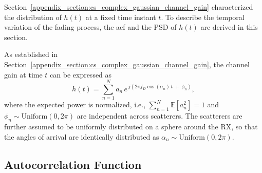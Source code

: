 Section~\ref{appendix_section:cs_complex_gaussian_channel_gain} characterized the distribution of $h(t)$ at a fixed time instant $t$.
To describe the temporal variation of the fading process, the \acf{acf} and the \acf{PSD} of $h(t)$ are derived in this section.

As established in Section~\ref{appendix_section:cs_complex_gaussian_channel_gain}, the channel gain at time $t$ can be expressed as
\begin{equation}
    h(t) = \sum_{n=1}^{N} a_n \, e^{\,j(2\pi f_D \cos(\alpha_n)\, t \;+\; \phi_n)},
\end{equation}
where the expected power is normalized, i.e., $\sum_{n=1}^{N} \mathbb{E}[a_n^2] = 1$ and $\phi_n \sim \mathrm{Uniform}(0, 2\pi)$ are independent across scatterers.
The scatterers are further assumed to be uniformly distributed on a sphere around the \ac{RX}, so that the angles of arrival are identically distributed as $\alpha_n \sim \mathrm{Uniform}(0, 2\pi)$.

\subsection*{Autocorrelation Function}
\label{appendix_section:acf_jakes_model}

